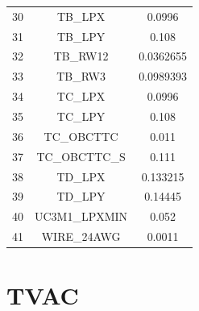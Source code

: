 \begin{table}[H]
\begin{tabular}{ccc}
        30 & TB\_LPX & 0.0996 \\
        31 & TB\_LPY & 0.108 \\
        32 & TB\_RW12 & 0.0362655 \\
        33 & TB\_RW3 & 0.0989393 \\
        34 & TC\_LPX & 0.0996 \\
        35 & TC\_LPY & 0.108 \\
        36 & TC\_OBCTTC & 0.011 \\
        37 & TC\_OBCTTC\_S & 0.111 \\
        38 & TD\_LPX & 0.133215 \\
        39 & TD\_LPY & 0.14445 \\
        40 & UC3M1\_LPXMIN & 0.052   \\
        41 & WIRE\_24AWG & 0.0011  \\
  
        \bottomrule
        \end{tabular}
    \end{table}

\section{TVAC}

